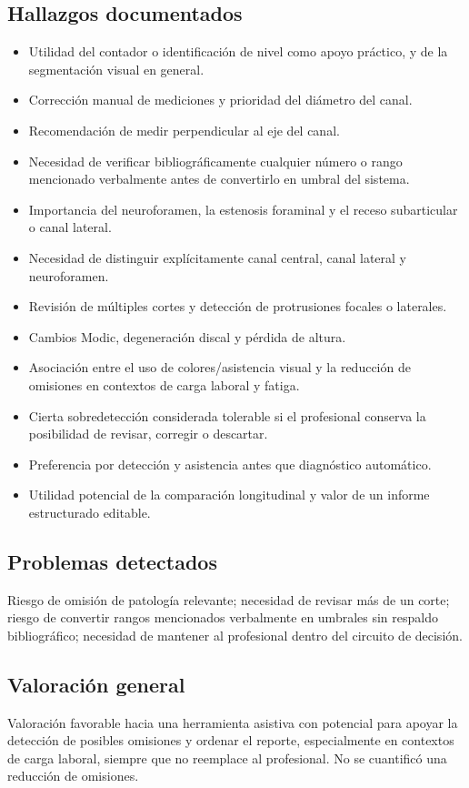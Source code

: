 \subsection*{Hallazgos documentados}
\begin{itemize}
    \item Utilidad del contador o identificación de nivel como apoyo práctico, y de la segmentación visual en general.
    \item Corrección manual de mediciones y prioridad del diámetro del canal.
    \item Recomendación de medir perpendicular al eje del canal.
    \item Necesidad de verificar bibliográficamente cualquier número o rango mencionado verbalmente antes de convertirlo en umbral del sistema.
    \item Importancia del neuroforamen, la estenosis foraminal y el receso subarticular o canal lateral.
    \item Necesidad de distinguir explícitamente canal central, canal lateral y neuroforamen.
    \item Revisión de múltiples cortes y detección de protrusiones focales o laterales.
    \item Cambios Modic, degeneración discal y pérdida de altura.
    \item Asociación entre el uso de colores/asistencia visual y la reducción de omisiones en contextos de carga laboral y fatiga.
    \item Cierta sobredetección considerada tolerable si el profesional conserva la posibilidad de revisar, corregir o descartar.
    \item Preferencia por detección y asistencia antes que diagnóstico automático.
    \item Utilidad potencial de la comparación longitudinal y valor de un informe estructurado editable.
\end{itemize}

\subsection*{Problemas detectados}
Riesgo de omisión de patología relevante; necesidad de revisar más de un corte; riesgo de convertir rangos mencionados verbalmente en umbrales sin respaldo bibliográfico; necesidad de mantener al profesional dentro del circuito de decisión.

\subsection*{Valoración general}
Valoración favorable hacia una herramienta asistiva con potencial para apoyar la detección de posibles omisiones y ordenar el reporte, especialmente en contextos de carga laboral, siempre que no reemplace al profesional. No se cuantificó una reducción de omisiones.

